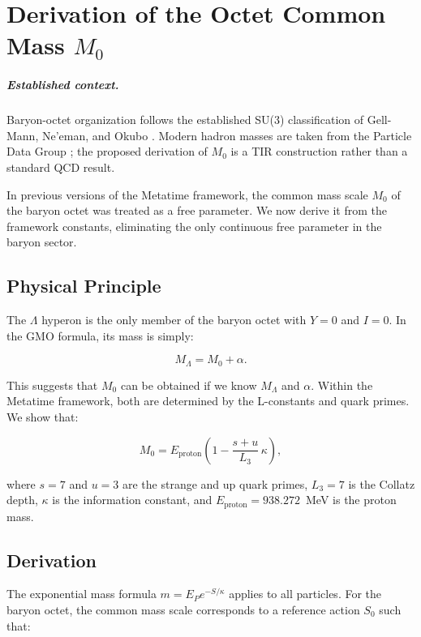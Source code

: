 \chapter{Derivation of the Octet Common Mass \(M_0\)}
\label{ch:octet_m0}


\paragraph{Established context.}
Baryon-octet organization follows the established SU(3) classification of
Gell-Mann, Ne'eman, and Okubo \cite{gellmann1961,Neeman1961,GellMann1962,okubo1962}.
Modern hadron masses are taken from the Particle Data Group \cite{PDG2024}; the
proposed derivation of $M_0$ is a TIR construction rather than a standard QCD
result.

In previous versions of the Metatime framework, the common mass scale
\(M_0\) of the baryon octet was treated as a free parameter.  We now derive
it from the framework constants, eliminating the only continuous free
parameter in the baryon sector.

\section{Physical Principle}

The \(\Lambda\) hyperon is the only member of the baryon octet with
\(Y = 0\) and \(I = 0\).  In the GMO formula, its mass is simply:

\[
M_\Lambda = M_0 + \alpha.
\]

This suggests that \(M_0\) can be obtained if we know \(M_\Lambda\) and
\(\alpha\).  Within the Metatime framework, both are determined by the
L-constants and quark primes.  We show that:

\[
M_0 = E_{\text{proton}}\left(1 - \frac{s+u}{L_3}\,\kappa\right),
\]

where \(s = 7\) and \(u = 3\) are the strange and up quark primes,
\(L_3 = 7\) is the Collatz depth, \(\kappa\) is the information constant,
and \(E_{\text{proton}} = 938.272\)~MeV is the proton mass.

\section{Derivation}

The exponential mass formula \(m = E_P e^{-S/\kappa}\) applies to all
particles.  For the baryon octet, the common mass scale corresponds to a
reference action \(S_0\) such that:

